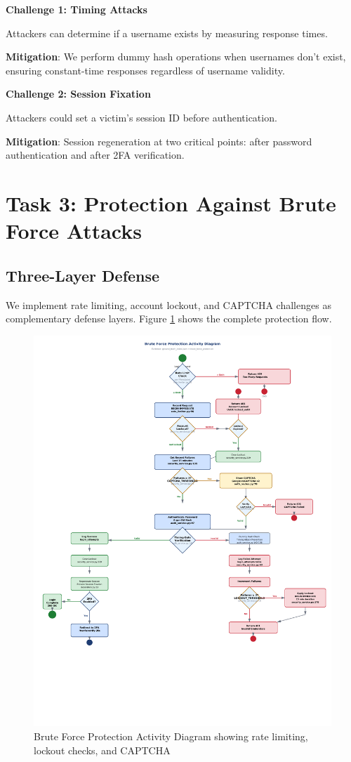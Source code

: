\documentclass[12pt,a4paper]{article}
\begin{document}
\textbf{Challenge 1: Timing Attacks}

Attackers can determine if a username exists by measuring response times.

\textbf{Mitigation}: We perform dummy hash operations when usernames don't exist, ensuring constant-time responses regardless of username validity.

\textbf{Challenge 2: Session Fixation}

Attackers could set a victim's session ID before authentication.

\textbf{Mitigation}: Session regeneration at two critical points: after password authentication and after 2FA verification.

\section{Task 3: Protection Against Brute Force Attacks}

\subsection{Three-Layer Defense}

We implement rate limiting, account lockout, and CAPTCHA challenges as complementary defense layers. Figure \ref{fig:brute_force} shows the complete protection flow.

\begin{figure}[H]
    \centering
    \includegraphics[width=\textwidth]{diagrams/6_brute_force_activity.pdf}
    \caption{Brute Force Protection Activity Diagram showing rate limiting, lockout checks, and CAPTCHA}
    \label{fig:brute_force}
\end{figure}
\end{document}
